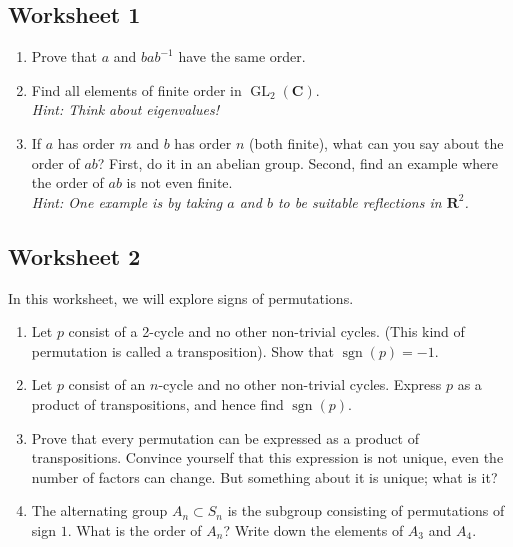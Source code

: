\documentclass[11pt]{article}
\begin{document}
\subsection{Worksheet 1}
\label{sec:orge767f8e}
\begin{enumerate}
\item Prove that \(a\) and \(bab^{-1}\) have the same order.

\item Find all elements of finite order in \(\operatorname{GL}_2(\mathbf{C})\).\\
\emph{Hint: Think about eigenvalues!}

\item If \(a\) has order \(m\) and \(b\) has order \(n\) (both finite), what can you say about the order of \(ab\)?
First, do it in an abelian group.
Second, find an example where the order of \(ab\) is not even finite. \\
\emph{Hint: One example is by taking \(a\) and \(b\) to be suitable reflections in \(\mathbf{R}^{2}\).}
\end{enumerate}


\subsection{Worksheet 2}
\label{sec:orgf008429}
In this worksheet, we will explore signs of permutations.

\begin{enumerate}
\item Let \(p\) consist of a 2-cycle and no other non-trivial cycles.
(This kind of permutation is called a transposition).
Show that \(\operatorname{sgn}(p) = -1\).

\item Let \(p\) consist of an \(n\)-cycle and no other non-trivial cycles.
Express \(p\) as a product of transpositions, and hence find \(\operatorname{sgn}(p)\).

\item Prove that every permutation can be expressed as a product of transpositions.
Convince yourself that this expression is not unique, even the number of factors can change.
But something about it is unique; what is it?

\item The alternating group \(A_n \subset S_n\) is the subgroup consisting of permutations of sign \(1\).
What is the order of \(A_n\)? 
Write down the elements of \(A_{3}\) and \(A_4\).
\end{enumerate}
\end{document}
